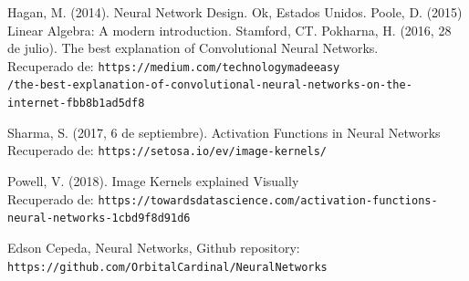 \documentclass{article}
\begin{document}
\begin{thebibliography}{9}

    Hagan, M. (2014). Neural Network Design. Ok, Estados Unidos.
    Poole, D. (2015) Linear Algebra: A modern introduction. Stamford, CT.
    Pokharna, H. (2016, 28 de julio). The best explanation of Convolutional Neural Networks. \\
    Recuperado de: \texttt{https://medium.com/technologymadeeasy} \\
    \texttt{/the-best-explanation-of-convolutional-neural-networks-on-the-internet-fbb8b1ad5df8}
    
    Sharma, S. (2017, 6 de septiembre). Activation Functions in Neural Networks \\
    Recuperado de: \texttt{https://setosa.io/ev/image-kernels/}
    
    
    Powell, V. (2018). Image Kernels explained Visually\\
    Recuperado de: \texttt{https://towardsdatascience.com/activation-functions-neural-networks-1cbd9f8d91d6}
    
    Edson Cepeda, Neural Networks, Github repository: \\
    \texttt{https://github.com/OrbitalCardinal/NeuralNetworks}
    
    \end{thebibliography}
\end{document}
